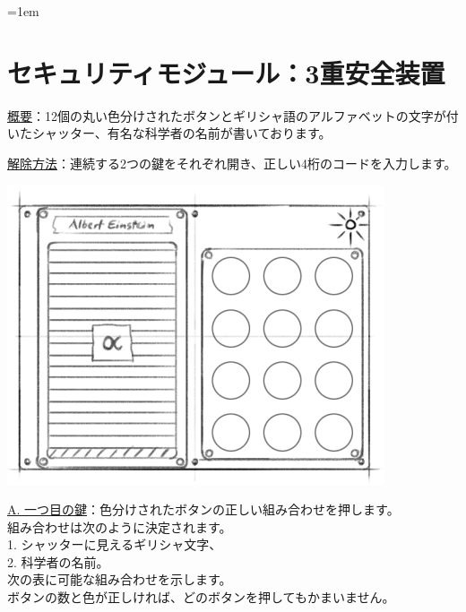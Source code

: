 \begin{minipage}{0.63\textwidth}
    \parskip=1em
    \section*{セキュリティモジュール：3重安全装置}
    
    \uline{概要}：12個の丸い色分けされたボタンとギリシャ語のアルファベットの文字が付いたシャッター、有名な科学者の名前が書いております。
    
    \uline{解除方法}：連続する2つの鍵をそれぞれ開き、正しい4桁のコードを入力します。
\end{minipage}%
\hfill%
\begin{minipage}{0.33\textwidth}
    \includegraphics[width=\textwidth]{images/31.png}
    \vspace*{\fill}
\end{minipage}

\uline{A. 一つ目の鍵}：色分けされたボタンの正しい組み合わせを押します。\\
組み合わせは次のように決定されます。\\
\hspace*{1em}1. シャッターに見えるギリシャ文字、\\
\hspace*{1em}2. 科学者の名前。\\
次の表に可能な組み合わせを示します。\\
ボタンの数と色が正しければ、どのボタンを押してもかまいません。

